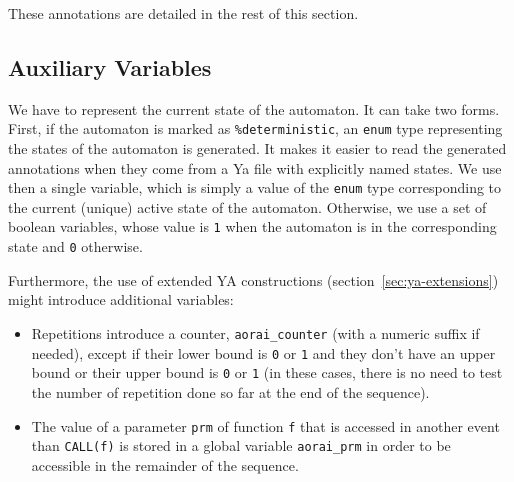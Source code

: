 \documentclass{report}
\begin{document}
These annotations are detailed in the rest of this section.

\subsection{Auxiliary Variables}
\label{SectGeneratedVariables}
\lstset{language=C}

We have to represent the current state of the automaton.
It can take two forms. First, if the automaton is marked as 
{\lstset{language=ya}\lstinline|%deterministic|},
an \lstinline|enum| type representing the states of the automaton is
generated. It makes it easier to read the generated annotations when they
come from a Ya file with explicitly named states. 
We use then a single variable, 
\curStates which is simply a value of the \lstinline|enum| type corresponding
to the current (unique) active state of the automaton.
Otherwise, we use a set of boolean variables, whose value is
\lstinline|1| when the automaton is in the corresponding state and
\lstinline|0| otherwise.

Furthermore, the use of extended YA constructions
(section~\ref{sec:ya-extensions}) might introduce additional variables:
\begin{itemize}
\item Repetitions introduce a counter, \lstinline|aorai_counter| (with a numeric
suffix if needed), except if their lower bound is \lstinline|0| or 
\lstinline|1| and they don't have an upper bound or their upper bound is 
\lstinline|0| or \lstinline|1| (in these cases, there is no need to
test the number of repetition done so far at the end of the sequence).
\item The value of a parameter \lstinline|prm| of function \lstinline|f| 
that is accessed in another event than \lstinline|CALL(f)| is stored in a global
variable \lstinline|aorai_prm| in order to be accessible in the remainder of the
sequence.
\end{itemize}

\end{document}
